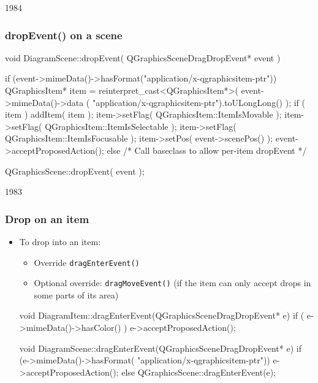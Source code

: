 \begin{slide}[fragile]{1984}


\frametitle{dropEvent() on a scene}
\begin{cpp}
void DiagramScene::dropEvent( QGraphicsSceneDragDropEvent* event ) {
    if (event->mimeData()->hasFormat("application/x-qgraphicsitem-ptr")) {
         QGraphicsItem* item = reinterpret_cast<QGraphicsItem*>(
              event->mimeData()->data (
              "application/x-qgraphicsitem-ptr").toULongLong() );
         if ( item ) {
             addItem( item );
             item->setFlag( QGraphicsItem::ItemIsMovable );
             item->setFlag( QGraphicsItem::ItemIsSelectable );
             item->setFlag( QGraphicsItem::ItemIsFocusable );
             item->setPos( event->scenePos() );
             event->acceptProposedAction();
         }
    } else
        /* Call baseclass to allow per-item dropEvent */

        QGraphicsScene::dropEvent( event );
}
\end{cpp}
\end{slide}


\begin{slide}[fragile]{1983}


\frametitle{Drop on an item}
\begin{itemize}
\item To drop into an item:
    \begin{itemize}
    \item Override \texttt{dragEnterEvent()}
    \item Optional override: \texttt{dragMoveEvent()} 
       (if the item can only accept drops in some parts of its area)
    \end{itemize}

\begin{cpp}
void DiagramItem::dragEnterEvent(QGraphicsSceneDragDropEvent* e){
    if ( e->mimeData()->hasColor() )
        e->acceptProposedAction();
}

void DiagramScene::dragEnterEvent(QGraphicsSceneDragDropEvent* e){
     if (e->mimeData()->hasFormat(
     "application/x-qgraphicsitem-ptr"))
         e->acceptProposedAction();
     else
         QGraphicsScene::dragEnterEvent(e);
}
\end{cpp}
\end{itemize}
\end{slide}


